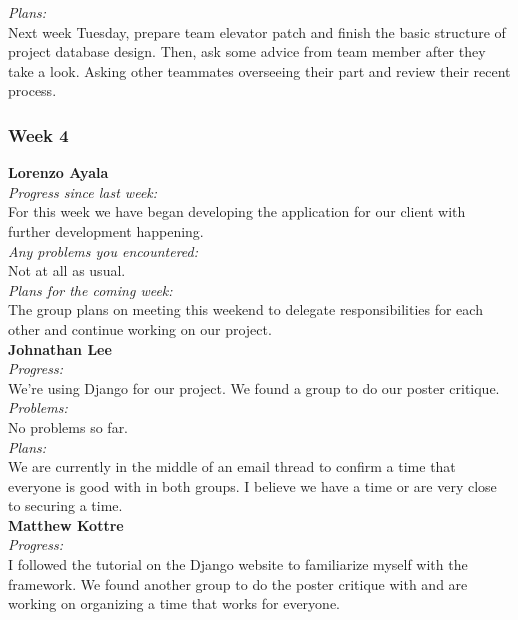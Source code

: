 \noindent\textit{Plans:}\\
\noindent  Next week Tuesday, prepare team elevator patch and finish the basic structure of project database design. Then, ask some advice from team member after they take a look. Asking other teammates overseeing their part and review their recent process.\\

\subsubsection{Week 4}

\textbf{Lorenzo Ayala}\\
\noindent\textit{Progress since last week:}\\
For this week we have began developing the application for our client with further development happening.\\

\noindent\textit{Any problems you encountered:}\\
\noindent Not at all as usual.\\

\noindent\textit{Plans for the coming week:}\\
\noindent The group plans on meeting this weekend to delegate responsibilities for each other and continue working on our project. \\

\noindent\textbf{Johnathan Lee}\\
\noindent\textit{Progress:}\\
We're using Django for our project. We found a group to do our poster critique. \\ 

\noindent\textit{Problems:}\\
\noindent No problems so far.\\

\noindent\textit{Plans:}\\
\noindent We are currently in the middle of an email thread to confirm a time that everyone is good with in both groups. I believe we have a time or are very close to securing a time.\\

\noindent\textbf{Matthew Kottre}\\
\noindent\textit{Progress:}\\
I followed the tutorial on the Django website to familiarize myself with the framework. We found another group to do the poster critique with and are working on organizing a time that works for everyone.\\


